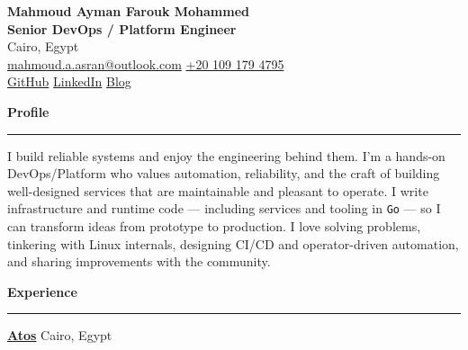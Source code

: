 \documentclass[a4paper,9pt]{extarticle}
\newcommand{\cvsection}[1]{%
  \vspace{5pt}%
  {\normalsize\bfseries\textcolor{accent}{#1}}\\[-5pt]%
  \textcolor{accent}{\rule{\linewidth}{0.5pt}}%
  \vspace{4pt}%
}
\begin{document}
\begin{center}
	{\LARGE\bfseries Mahmoud Ayman Farouk Mohammed} \\[4pt]
	{\normalsize\textcolor{accent}{\textbf{Senior DevOps / Platform Engineer}}} \\[6pt]
	{\footnotesize Cairo, Egypt} \\[4pt]

	{\footnotesize
	\href{mailto:mahmoud.a.asran@outlook.com}{mahmoud.a.asran@outlook.com}\quad \textbullet \quad
	\href{tel:+201091794795}{+20 109 179 4795} \\[3pt]
	\href{https://github.com/mahmoudk1000}{GitHub}\quad \textbullet \quad
	\href{https://www.linkedin.com/in/mahmoudk1000}{LinkedIn}\quad \textbullet \quad
	\href{https://mahmoudk1000.github.io/}{Blog}
	}
\end{center}

\vspace{2pt}

\cvsection{Profile}
{\footnotesize
	I build reliable systems and enjoy the engineering behind them. I'm a hands-on DevOps/Platform who values automation, reliability, and the craft of building well-designed services that are maintainable and pleasant to operate. I write infrastructure and runtime code --- including services and tooling in \texttt{Go} --- so I can transform ideas from prototype to production. I love solving problems, tinkering with Linux internals, designing CI/CD and operator-driven automation, and sharing improvements with the community.
}

\cvsection{Experience}

{\textbf{\href{https://atos.net}{Atos}}} \hfill {\footnotesize\textcolor{muted}{Cairo, Egypt}}\par\vspace{2pt}
\end{document}
